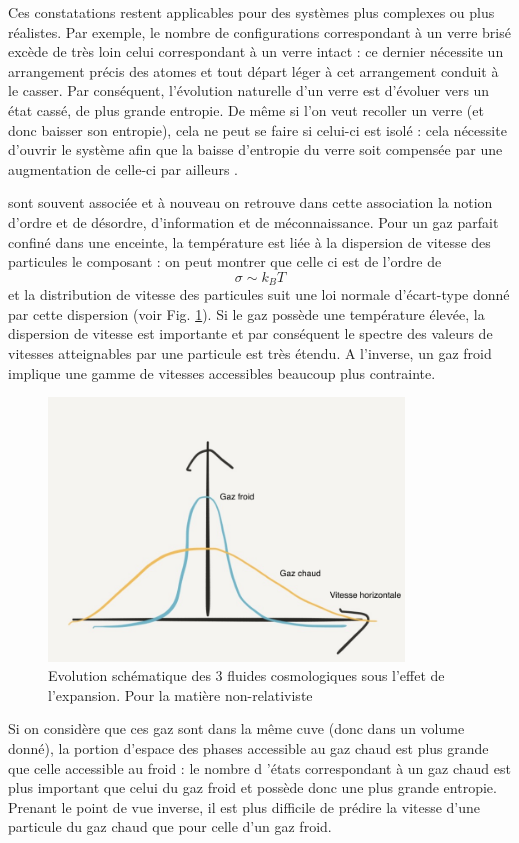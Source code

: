 Ces constatations restent applicables pour des systèmes plus complexes ou plus réalistes. Par exemple, le nombre de configurations correspondant à un verre brisé excède de très loin celui correspondant à un verre intact : ce dernier nécessite un arrangement précis des atomes et tout départ léger à cet arrangement conduit à le casser. Par conséquent, l'évolution naturelle d'un verre est d'évoluer vers un état cassé, de plus grande entropie. De même si l'on veut recoller un verre (et donc baisser son entropie), cela ne peut se faire si celui-ci est isolé : cela nécessite d'ouvrir le système afin que la baisse d'entropie du verre soit compensée par une augmentation de celle-ci par ailleurs . 

 sont souvent associée et à nouveau on retrouve dans cette association la notion d'ordre et de désordre, d'information et de méconnaissance. Pour un gaz parfait confiné dans une enceinte, la température est liée à la dispersion de vitesse des particules le composant : on peut montrer que celle ci est de l'ordre de
\begin{equation}
\sigma \sim k_B T
\end{equation}
et la distribution de vitesse des particules suit une loi normale d'écart-type donné par cette dispersion (voir Fig. \ref{f:disp}). Si le gaz possède une température élevée, la dispersion de vitesse est importante et par conséquent le spectre des valeurs de vitesses atteignables par une particule est très étendu. A l'inverse, un gaz froid implique une gamme de vitesses accessibles beaucoup plus contrainte.
\begin{figure}[htbp]
	\centering
		\includegraphics[height=7cm]{figs/dispersion.png}
	\caption{Evolution schématique des 3 fluides cosmologiques sous l'effet de l'expansion. Pour la matière non-relativiste}
	\label{f:disp}
\end{figure}
Si on considère que ces gaz sont dans la même cuve (donc dans un volume donné), la portion d'espace des phases accessible au gaz chaud est plus grande que celle accessible au froid : le nombre d 'états correspondant à un gaz chaud est plus important que celui du gaz froid et possède donc une plus grande entropie. Prenant le point de vue inverse, il est plus difficile de prédire la vitesse d'une particule du gaz chaud que pour celle d'un gaz froid.

